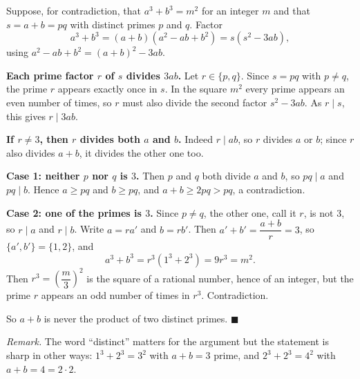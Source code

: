 Suppose, for contradiction, that $a^3+b^3=m^2$ for an integer $m$ and that $s=a+b=pq$ with distinct primes $p$ and $q$. Factor
\[a^3+b^3=(a+b)\left(a^2-ab+b^2\right)=s\left(s^2-3ab\right),\]
using $a^2-ab+b^2=(a+b)^2-3ab$.

\textbf{Each prime factor $r$ of $s$ divides $3ab$.} Let $r\in\{p,q\}$. Since $s=pq$ with $p\ne q$, the prime $r$ appears exactly once in $s$. In the square $m^2$ every prime appears an even number of times, so $r$ must also divide the second factor $s^2-3ab$. As $r\mid s$, this gives $r\mid 3ab$.

\textbf{If $r\ne3$, then $r$ divides both $a$ and $b$.} Indeed $r\mid ab$, so $r$ divides $a$ or $b$; since $r$ also divides $a+b$, it divides the other one too.

\textbf{Case 1: neither $p$ nor $q$ is $3$.} Then $p$ and $q$ both divide $a$ and $b$, so $pq\mid a$ and $pq\mid b$. Hence $a\ge pq$ and $b\ge pq$, and $a+b\ge2pq>pq$, a contradiction.

\textbf{Case 2: one of the primes is $3$.} Since $p\ne q$, the other one, call it $r$, is not $3$, so $r\mid a$ and $r\mid b$. Write $a=ra'$ and $b=rb'$. Then $a'+b'=\dfrac{a+b}{r}=3$, so $\{a',b'\}=\{1,2\}$, and
\[a^3+b^3=r^3\left(1^3+2^3\right)=9r^3=m^2 .\]
Then $r^3=\left(\dfrac {m}{3}\right)^2$ is the square of a rational number, hence of an integer, but the prime $r$ appears an odd number of times in $r^3$. Contradiction.

So $a+b$ is never the product of two distinct primes. $\blacksquare$

\emph{Remark.} The word ``distinct'' matters for the argument but the statement is sharp in other ways: $1^3+2^3=3^2$ with $a+b=3$ prime, and $2^3+2^3=4^2$ with $a+b=4=2\cdot2$.
